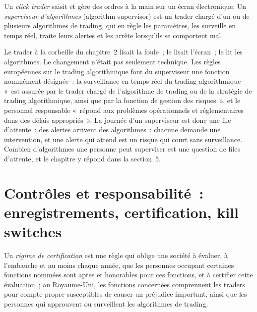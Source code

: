\begin{definition}\label{def:in:trader:supervisor}
Un \emph{click trader} saisit et gère des ordres à la main sur un écran électronique.
Un \emph{superviseur d'algorithmes} (algorithm supervisor) est un trader chargé d'un ou de plusieurs algorithmes de trading, qui
en règle les paramètres, les surveille en temps réel, traite leurs alertes et les arrête lorsqu'ils se comportent mal.
\end{definition}

Le trader à la corbeille du chapitre~2 lisait la foule~; le  lisait l'écran~; le  lit les
algorithmes. Le changement n'était pas seulement technique. Les règles européennes sur le trading algorithmique font du superviseur une fonction nommément désignée~: la
surveillance en temps réel du trading algorithmique «~est assurée par le trader chargé de l'algorithme de trading ou
de la stratégie de trading algorithmique, ainsi que par la fonction de gestion des risques~», et le personnel responsable «~répond
aux problèmes opérationnels et réglementaires dans des délais appropriés~». La journée d'un superviseur est donc une file d'attente~: des alertes arrivent
des algorithmes~: chacune demande une intervention, et une alerte qui attend est un risque qui court sans surveillance. Combien d'algorithmes
une personne peut superviser est une question de files d'attente, et le chapitre y répond dans la section~5.

\section{Contrôles et responsabilité~: enregistrements, certification, kill switches}

\begin{definition}\label{def:in:trader:certification}
Un \emph{régime de certification} est une règle qui oblige une société à évaluer, à l'embauche et au moins
chaque année, que les personnes occupant certaines fonctions nommées sont aptes et honorables pour ces fonctions, et à certifier cette évaluation~; au Royaume-Uni, les fonctions concernées comprennent
les traders pour compte propre susceptibles de causer un préjudice important, ainsi que les personnes qui approuvent ou surveillent les algorithmes de trading.
\end{definition}


